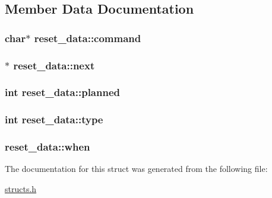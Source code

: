 \subsection{Member Data Documentation}
\hypertarget{structreset__data_a154e87496be589f7368bd44df6ff35b8}{
\subsubsection[{command}]{\setlength{\rightskip}{0pt plus 5cm}char$\ast$ reset\-\_\-data\-::command}}\label{structreset__data_a154e87496be589f7368bd44df6ff35b8}
\hypertarget{structreset__data_a970a80e250723327432365f14d118603}{
\subsubsection[{next}]{$\ast$ reset\-\_\-data\-::next}}\label{structreset__data_a970a80e250723327432365f14d118603}
\hypertarget{structreset__data_a048db6f0dd944e163a034a683cefc9eb}{
\subsubsection[{planned}]{\setlength{\rightskip}{0pt plus 5cm}int reset\-\_\-data\-::planned}}\label{structreset__data_a048db6f0dd944e163a034a683cefc9eb}
\hypertarget{structreset__data_af518385675ad348fe04d9408d896ab4b}{
\subsubsection[{type}]{\setlength{\rightskip}{0pt plus 5cm}int reset\-\_\-data\-::type}}\label{structreset__data_af518385675ad348fe04d9408d896ab4b}
\hypertarget{structreset__data_a0eb10a34752f22bfe0d2dab4686771ba}{
\subsubsection[{when}]{ reset\-\_\-data\-::when}}\label{structreset__data_a0eb10a34752f22bfe0d2dab4686771ba}


The documentation for this struct was generated from the following file\-:\begin{DoxyCompactItemize}
\item 
\hyperlink{structs_8h}{structs.\-h}\end{DoxyCompactItemize}
